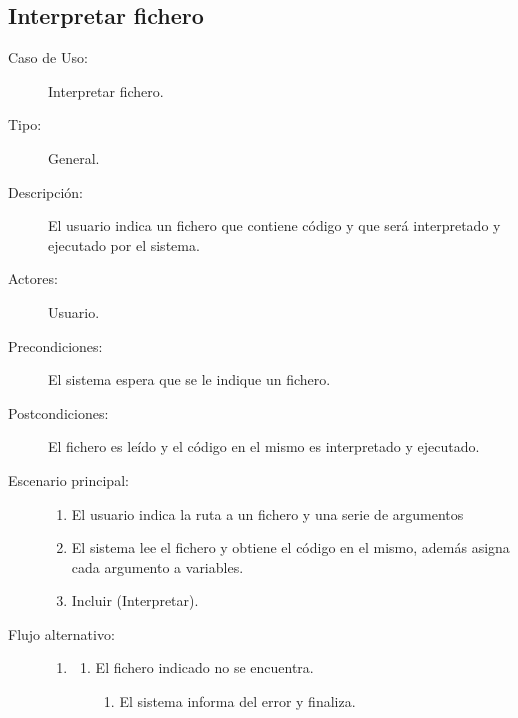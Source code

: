 \subsection{Interpretar fichero}
\begin{framed}
\FloatBarrier
\begin{description}
   \item[Caso de Uso:]  Interpretar fichero.
   \item[Tipo:] General.
   \item[Descripción:] 
   El usuario indica un fichero que contiene código y que será 
   interpretado y ejecutado por el sistema.
   \item[Actores:] 
   Usuario.
   \item[Precondiciones:] 
   El sistema espera que se le indique un fichero.
   \item[Postcondiciones:] 
   El fichero es leído y el código en el mismo es interpretado y ejecutado.
   \item[Escenario principal:] \hfill
   \begin{enumerate}
   \item El usuario indica la ruta a un fichero y una serie de argumentos
   \item El sistema lee el fichero y obtiene el código en el mismo, además asigna cada argumento a variables.
   \item Incluir (Interpretar).
   \end{enumerate}
   
   \item[Flujo alternativo:] \hfill 
   \begin{enumerate} \itemsep1pt \parskip0pt 
   \setcounter{enumi}{1}
   \renewcommand{\labelenumi}{}
   \renewcommand{\labelenumiii}{\arabic{enumiii}.}
   \renewcommand{\labelenumii}{\arabic{enumi}\alph{enumii}.}
      \item 
      \begin {enumerate}
         \setcounter{enumii}{0}
         \item El fichero indicado no se encuentra.
         \begin{enumerate}
         \item El sistema informa del error y finaliza.
         \end{enumerate}
      \end{enumerate}
   \end{enumerate}
\end{description}
 \FloatBarrier
\end{framed}
